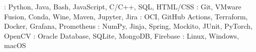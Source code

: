 
    {: Python, Java, Bash, JavaScript, C/C++, SQL, HTML/CSS}
    {: Git, VMware Fusion, Conda, Wine, Maven, Jupyter, Jira}
    {: OCI, GitHub Actions, Terraform, Docker, Grafana, Prometheus}
    {: NumPy, Jinja, Spring, Mockito, JUnit, PyTorch, OpenCV} %
    {: Oracle Database, SQLite, MongoDB, Firebase}
    {: Linux, Windows, macOS}
